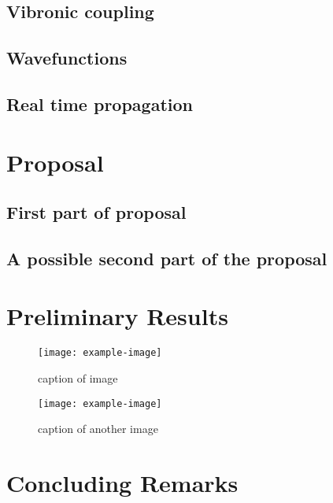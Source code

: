 \documentclass[12pt, letterpaper, oneside]{article}  %
\begin{document}
\subsection{Vibronic coupling}
\lipsum[53-55]
\subsection{Wavefunctions}
\lipsum[58-60]
\subsection{Real time propagation}
\lipsum[62-64]
\newpage%


\section{Proposal}
\subsection{First part of proposal}
\lipsum[47-50]
\subsection{A possible second part of the proposal}
\lipsum[47-50]
\newpage%


\section{Preliminary Results}

\lipsum[41]

\begin{figure}[!h]
    \center
    \texttt{[image: example-image]}
    \caption{\label{fig:one}caption of image}
\end{figure}

\lipsum[70-72]

\begin{figure}
    \center
    \texttt{[image: example-image]}
    \caption{\label{fig:two}caption of another image}
\end{figure}

\newpage%


\section{Concluding Remarks}
\lipsum[80-81]
\newpage%


\renewcommand*{\bibfont}{\scriptsize}
\printbibliography
\end{document}
